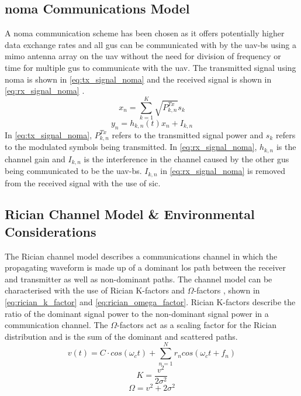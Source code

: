 \subsection{\texorpdfstring{\acrshort{noma}}{NOMA} Communications Model}
A \acrshort{noma} communication scheme has been chosen as it offers potentially higher data exchange rates and all \acrshort{gu}s can be communicated with by the \acrshort{uav}-\acrshort{bs} using a \acrshort{mimo} antenna array on the \acrshort{uav} without the need for division of frequency or time for multiple \acrshort{gu}s to communicate with the \acrshort{uav}. 
The transmitted signal using \acrshort{noma} is shown in \ref{eq:tx_signal_noma} and the received signal is shown in \ref{eq:rx_signal_noma} \cite{silvirianti_layerwise_2024, bizaki_towards_2016}. 
\begin{equation} \label{eq:tx_signal_noma}
    x_{n} = \sum_{k=1}^{K} \sqrt{P_{k, n}^{Tx}} s_{k}
\end{equation}
\begin{equation} \label{eq:rx_signal_noma}
   y_{n} = h_{k, n} (t) x_{n} + I_{k, n}
\end{equation}
In \ref{eq:tx_signal_noma}, $P_{k, n}^{Tx}$ refers to the transmitted signal power and $s_k$ refers to the modulated symbols being transmitted. 
In \ref{eq:rx_signal_noma}, $h_{k, n}$ is the channel gain and $I_{k, n}$ is the interference in the channel caused by the other \acrshort{gu}s being communicated to be the \acrshort{uav}-\acrshort{bs}. 
$I_{k, n}$ in \ref{eq:rx_signal_noma} is removed from the received signal with the use of \acrfull{sic}. 

\subsection{Rician Channel Model \& Environmental Considerations}
The Rician channel model describes a communications channel in which the propagating waveform is made up of a dominant \acrshort{los} path between the receiver and transmitter as well as non-dominant paths. 
The channel model can be characterised with the use of Rician K-factors and $\Omega$-factors \cite{rice_statistical_1948}, shown in \ref{eq:rician_k_factor} and \ref{eq:rician_omega_factor}. 
Rician K-factors describe the ratio of the dominant signal power to the non-dominant signal power in a communication channel. 
The $\Omega$-factors act as a scaling factor for the Rician distribution and is the sum of the dominant and scattered paths. 
\begin{equation} \label{eq:dom_and_non_dom_signal}
    v(t) = C \cdot cos(\omega_{c}t) + \sum_{n=1}^{N} r_n cos(\omega_{c}t + f_n)
\end{equation}
\begin{equation} \label{eq:rician_k_factor}
    K = \frac{v^{2}}{2\sigma^{2}}
\end{equation}
\begin{equation} \label{eq:rician_omega_factor}
    \Omega = v^{2} + 2\sigma^{2}
\end{equation} 

